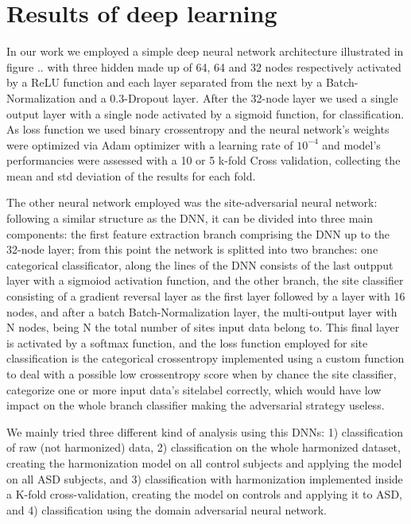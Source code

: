 \documentclass[a4paper,11pt]{article}
\begin{document}
\section{Results of deep learning}

In our work we employed a simple deep neural network architecture illustrated in figure .. with three hidden made up of 64, 64 and 32 nodes respectively activated by a ReLU function and each layer separated from the next by a Batch-Normalization and a 0.3-Dropout layer. After the 32-node layer we used a single output layer with a single node activated by a sigmoid function, for classification.
As loss function we used binary crossentropy and the neural network's weights were optimized via Adam optimizer with a learning rate of $10^{-4}$ and model's performancies were assessed with a 10 or 5 k-fold Cross validation, collecting the mean and std deviation of the results for each fold.

The other neural network employed was the site-adversarial neural network: following a similar structure as the DNN, it can be divided into three main components: the first feature extraction branch comprising the DNN up to the 32-node layer;
from this point the network is splitted into two branches: one categorical classificator, along the lines of the DNN consists of the last outpput layer with a sigmoiod activation function, and the other branch, the site classifier consisting of a gradient reversal layer as the first layer followed by a layer with 16 nodes, and after a batch Batch-Normalization layer, the multi-output layer with N nodes, being N the total number of sites input data belong to.
This final layer is activated by a softmax function, and the loss function employed for site classification is the categorical crossentropy implemented using a custom function to deal with a possible low crossentropy score when by chance the site classifier, categorize one or more input data's sitelabel correctly, which would have low impact on the whole branch classifier making the adversarial strategy useless.


We mainly tried three different kind of analysis using this DNNs: 1) classification of raw (not harmonized) data, 2) classification on the whole harmonized dataset, creating the harmonization model on all control subjects and applying the model on all ASD subjects, and 3) classification with harmonization implemented inside a K-fold cross-validation, creating the model on controls and applying it to ASD, and 4) classification using the domain adversarial neural network.
\end{document}
